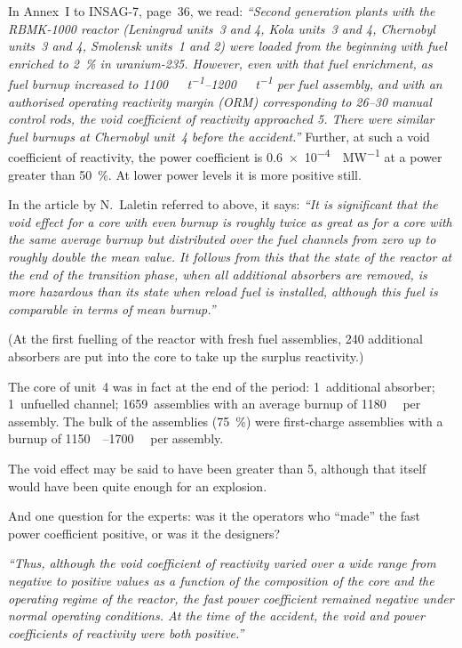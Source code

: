 \documentclass[openright]{bookest}
\begin{document}
In Annex~I to INSAG-7, page~36, we read: \textit{``Second generation plants with the RBMK-1000 reactor (Leningrad units~3 and 4, Kola units~3 and 4, Chernobyl units~3 and 4, Smolensk units~1 and 2) were loaded from the beginning with fuel enriched to \qty{2}{\percent} in uranium-235. However, even with that fuel enrichment, as fuel burnup increased to \qtyrange[range-phrase=\text{--}]{1100}{1200}{\mega\Wd\per\tonne} per fuel assembly, and with an authorised operating reactivity margin (ORM) corresponding to \numrange{26}{30} manual control rods, the void coefficient of reactivity approached \qty{+5}{\betaeff}. There were similar fuel burnups at Chernobyl unit~4 before the accident.''} Further, at such a void coefficient of reactivity, the power coefficient is \qty{+0.6e-4}{\betaeff\per\mega\watt} at a power greater than \qty{50}{\percent}. At lower power levels it is more positive still.

In the article by N.~Laletin referred to above, it says: \textit{``It is significant that the void effect for a core with even burnup is roughly twice as great as for a core with the same average burnup but distributed over the fuel channels from zero up to roughly double the mean value. It follows from this that the state of the reactor at the end of the transition phase, when all additional absorbers are removed, is more hazardous than its state when reload fuel is installed, although this fuel is comparable in terms of mean burnup.''}

(At the first fuelling of the reactor with fresh fuel assemblies, 240 additional absorbers are put into the core to take up the surplus reactivity.)

The core of unit~4 was in fact at the end of the period: 1~additional absorber; 1~unfuelled channel; 1659~assemblies with an average burnup of \qty{1180}{\mega\Wd} per assembly. The bulk of the assemblies (\qty{75}{\percent}) were first-charge assemblies with a burnup of \qtyrange{1150}{1700}{\mega\Wd} per assembly.

The void effect may be said to have been greater than \qty{+5}{\betaeff}, although that itself would have been quite enough for an explosion.

And one question for the experts: was it the operators who ``made'' the fast power coefficient positive, or was it the designers?

\begin{personal}[INSAG-7 (§2.1):]
\textit{``Thus, although the void coefficient of reactivity varied over a wide range from negative to positive values as a function of the composition of the core and the operating regime of the reactor, the fast power coefficient remained negative under normal operating conditions. At the time of the accident, the void and power coefficients of reactivity were both positive.''}
\end{personal}
\end{document}
